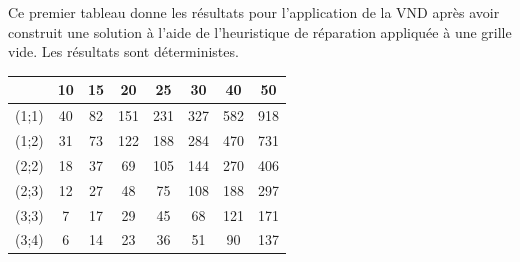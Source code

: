 \documentclass[12pt,a4paper]{article}
\begin{document}
Ce premier tableau donne les résultats pour l'application de la VND après avoir construit une solution à l'aide de l'heuristique de réparation appliquée à une grille vide. Les résultats sont déterministes. 
\begin{center}
\begin{tabular}{|c|c|c|c|c|c|c|c|}
\hline
&10 & 15 & 20 & 25 & 30 & 40 & 50\\
\hline 
(1;1) & 40 & 82 & 151 & 231 & 327 & 582 & 918 \\ 
\hline 
(1;2) & 31 & 73 & 122 & 188 & 284 & 470 & 731 \\ 
\hline 
(2;2) & 18 & 37 & 69 & 105 & 144 & 270 & 406 \\ 
\hline 
(2;3) & 12 & 27 & 48 & 75 & 108 & 188 & 297 \\ 
\hline 
(3;3) & 7 & 17 & 29 & 45 & 68 & 121 & 171 \\ 
\hline 
(3;4) & 6 & 14 & 23 & 36 & 51 & 90 & 137 \\ 
\hline 
\end{tabular} 
\end{center}
\end{document}
